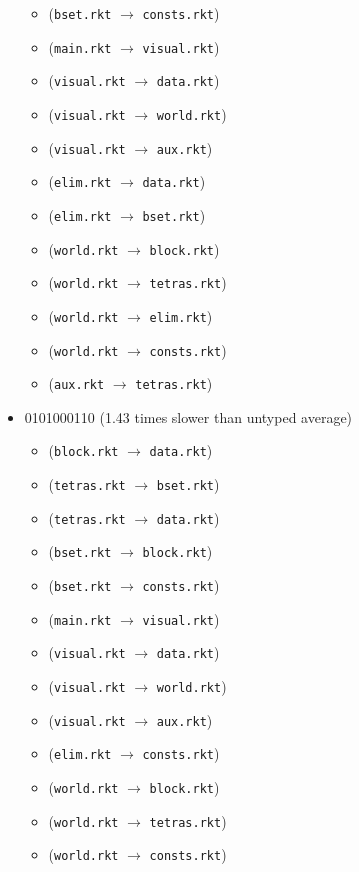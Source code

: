 \documentclass{article}
\newcommand{\mono}[1]{\texttt{#1}}
\begin{document}
\begin{itemize}
\begin{itemize}
  \item (\mono{bset.rkt} $\rightarrow$ \mono{consts.rkt})
  \item (\mono{main.rkt} $\rightarrow$ \mono{visual.rkt})
  \item (\mono{visual.rkt} $\rightarrow$ \mono{data.rkt})
  \item (\mono{visual.rkt} $\rightarrow$ \mono{world.rkt})
  \item (\mono{visual.rkt} $\rightarrow$ \mono{aux.rkt})
  \item (\mono{elim.rkt} $\rightarrow$ \mono{data.rkt})
  \item (\mono{elim.rkt} $\rightarrow$ \mono{bset.rkt})
  \item (\mono{world.rkt} $\rightarrow$ \mono{block.rkt})
  \item (\mono{world.rkt} $\rightarrow$ \mono{tetras.rkt})
  \item (\mono{world.rkt} $\rightarrow$ \mono{elim.rkt})
  \item (\mono{world.rkt} $\rightarrow$ \mono{consts.rkt})
  \item (\mono{aux.rkt} $\rightarrow$ \mono{tetras.rkt})
  \end{itemize}
\item 0101000110 (1.43 times slower than untyped average)
  \begin{itemize}
  \item (\mono{block.rkt} $\rightarrow$ \mono{data.rkt})
  \item (\mono{tetras.rkt} $\rightarrow$ \mono{bset.rkt})
  \item (\mono{tetras.rkt} $\rightarrow$ \mono{data.rkt})
  \item (\mono{bset.rkt} $\rightarrow$ \mono{block.rkt})
  \item (\mono{bset.rkt} $\rightarrow$ \mono{consts.rkt})
  \item (\mono{main.rkt} $\rightarrow$ \mono{visual.rkt})
  \item (\mono{visual.rkt} $\rightarrow$ \mono{data.rkt})
  \item (\mono{visual.rkt} $\rightarrow$ \mono{world.rkt})
  \item (\mono{visual.rkt} $\rightarrow$ \mono{aux.rkt})
  \item (\mono{elim.rkt} $\rightarrow$ \mono{consts.rkt})
  \item (\mono{world.rkt} $\rightarrow$ \mono{block.rkt})
  \item (\mono{world.rkt} $\rightarrow$ \mono{tetras.rkt})
  \item (\mono{world.rkt} $\rightarrow$ \mono{consts.rkt})

\end{itemize}
\end{itemize}
\end{document}
